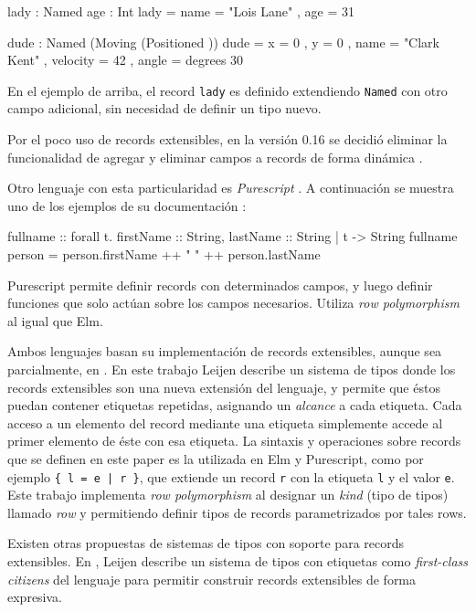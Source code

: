 \begin{code}
lady : Named { age : Int }
lady =
  { name = "Lois Lane"
  , age = 31 
  }

dude : Named (Moving (Positioned {}))
dude =
  { x = 0
  , y = 0
  , name = "Clark Kent"
  , velocity = 42
  , angle = degrees 30
  }
\end{code}

En el ejemplo de arriba, el record \texttt{lady} es definido extendiendo \texttt{Named} con otro campo adicional, sin necesidad de definir un tipo nuevo.

Por el poco uso de records extensibles, en la versión 0.16 se decidió eliminar la funcionalidad de agregar y eliminar campos a records de forma dinámica \cite{ElmReducedRecordSyntax}.

Otro lenguaje con esta particularidad es \textit{Purescript} \cite{PurescriptByExample}. A continuación se muestra uno de los ejemplos de su documentación \cite{PurescriptRecords}:

\begin{code}
fullname :: forall t. { firstName :: String,
  lastName :: String | t } -> String
fullname person = person.firstName ++ " " ++ 
  person.lastName
\end{code}

Purescript permite definir records con determinados campos, y luego definir funciones que solo actúan sobre los campos necesarios. Utiliza \textit{row polymorphism} al igual que Elm.

Ambos lenguajes basan su implementación de records extensibles, aunque sea parcialmente, en \cite{Leijen:scopedlabels}. En este trabajo Leijen describe un sistema de tipos donde los records extensibles son una nueva extensión del lenguaje, y permite que éstos puedan contener etiquetas repetidas, asignando un \textit{alcance} a cada etiqueta. Cada acceso a un elemento del record mediante una etiqueta simplemente accede al primer elemento de éste con esa etiqueta. La sintaxis y operaciones sobre records que se definen en este paper es la utilizada en Elm y Purescript, como por ejemplo \texttt{\{ l = e | r \}}, que extiende un record \texttt{r} con la etiqueta \texttt{l} y el valor \texttt{e}. Este trabajo implementa \textit{row polymorphism} al designar un \textit{kind} (tipo de tipos) llamado \textit{row} y permitiendo definir tipos de records parametrizados por tales rows.

Existen otras propuestas de sistemas de tipos con soporte para records extensibles. En \cite{Leijen:fclabels}, Leijen describe un sistema de tipos con etiquetas como \textit{first-class citizens} del lenguaje para permitir construir records extensibles de forma expresiva. 

